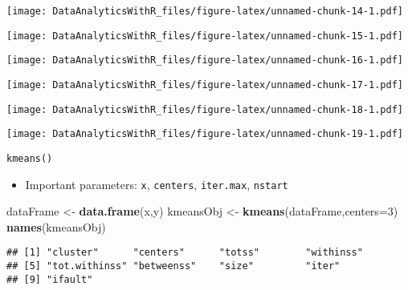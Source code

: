 \documentclass[]{book}
\newenvironment{Shaded}{\begin{snugshade}}{\end{snugshade}}
\newcommand{\KeywordTok}[1]{\textcolor[rgb]{0.13,0.29,0.53}{\textbf{{#1}}}}
\newcommand{\DataTypeTok}[1]{\textcolor[rgb]{0.13,0.29,0.53}{{#1}}}
\newcommand{\DecValTok}[1]{\textcolor[rgb]{0.00,0.00,0.81}{{#1}}}
\newcommand{\FloatTok}[1]{\textcolor[rgb]{0.00,0.00,0.81}{{#1}}}
\newcommand{\StringTok}[1]{\textcolor[rgb]{0.31,0.60,0.02}{{#1}}}
\newcommand{\NormalTok}[1]{{#1}}
\providecommand{\tightlist}{%
  \setlength{\itemsep}{0pt}\setlength{\parskip}{0pt}}
\begin{document}
\begin{Shaded}
\end{Shaded}

\texttt{[image: DataAnalyticsWithR\_files/figure-latex/unnamed-chunk-14-1.pdf]}

\texttt{[image: DataAnalyticsWithR\_files/figure-latex/unnamed-chunk-15-1.pdf]}

\texttt{[image: DataAnalyticsWithR\_files/figure-latex/unnamed-chunk-16-1.pdf]}

\texttt{[image: DataAnalyticsWithR\_files/figure-latex/unnamed-chunk-17-1.pdf]}

\texttt{[image: DataAnalyticsWithR\_files/figure-latex/unnamed-chunk-18-1.pdf]}

\texttt{[image: DataAnalyticsWithR\_files/figure-latex/unnamed-chunk-19-1.pdf]}

\texttt{kmeans()}

\begin{itemize}
\tightlist
\item
  Important parameters: \texttt{x}, \texttt{centers}, \texttt{iter.max},
  \texttt{nstart}
\end{itemize}

\begin{Shaded}
\begin{Highlighting}[]
\NormalTok{dataFrame <-}\StringTok{ }\KeywordTok{data.frame}\NormalTok{(x,y)}
\NormalTok{kmeansObj <-}\StringTok{ }\KeywordTok{kmeans}\NormalTok{(dataFrame,}\DataTypeTok{centers=}\DecValTok{3}\NormalTok{)}
\KeywordTok{names}\NormalTok{(kmeansObj)}
\end{Highlighting}
\end{Shaded}

\begin{verbatim}
## [1] "cluster"      "centers"      "totss"        "withinss"    
## [5] "tot.withinss" "betweenss"    "size"         "iter"        
## [9] "ifault"
\end{verbatim}
\end{document}
